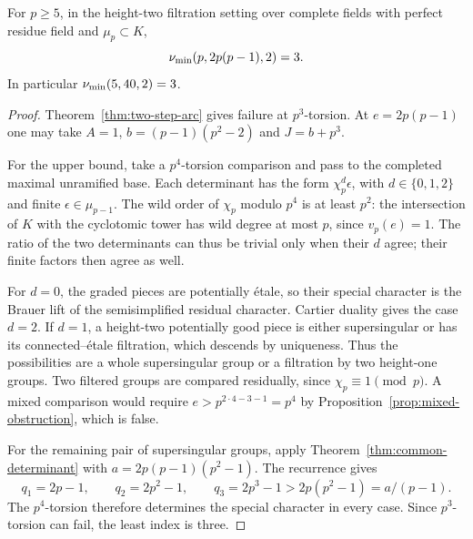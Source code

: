 \begin{theorem}\label{thm:second-wild-exact}
For $p\ge5$, in the height-two filtration setting over complete fields with perfect residue field and $\mu_p\subset K$,
\[
                         \nu_{\min}(p,2p(p-1),2)=3.
\]
In particular $\nu_{\min}(5,40,2)=3$.
\end{theorem}
\begin{proof}
Theorem~\ref{thm:two-step-arc} gives failure at $p^3$-torsion. At $e=2p(p-1)$ one may take $A=1$, $b=(p-1)(p^2-2)$ and $J=b+p^3$.

For the upper bound, take a $p^4$-torsion comparison and pass to the completed maximal unramified base. Each determinant has the form $\chi_p^d\epsilon$, with $d\in\{0,1,2\}$ and finite $\epsilon\in\mu_{p-1}$. The wild order of $\chi_p$ modulo $p^4$ is at least $p^2$: the intersection of $K$ with the cyclotomic tower has wild degree at most $p$, since $v_p(e)=1$. The ratio of the two determinants can thus be trivial only when their $d$ agree; their finite factors then agree as well.

For $d=0$, the graded pieces are potentially \'etale, so their special character is the Brauer lift of the semisimplified residual character. Cartier duality gives the case $d=2$. If $d=1$, a height-two potentially good piece is either supersingular or has its connected--\'etale filtration, which descends by uniqueness. Thus the possibilities are a whole supersingular group or a filtration by two height-one groups. Two filtered groups are compared residually, since $\chi_p\equiv1\pmod p$. A mixed comparison would require $e>p^{2\cdot4-3-1}=p^4$ by Proposition~\ref{prop:mixed-obstruction}, which is false.

For the remaining pair of supersingular groups, apply Theorem~\ref{thm:common-determinant} with $a=2p(p-1)(p^2-1)$. The recurrence gives
\[
 q_1=2p-1,\qquad q_2=2p^2-1,\qquad
 q_3=2p^3-1>2p(p^2-1)=a/(p-1).
\]
The $p^4$-torsion therefore determines the special character in every case. Since $p^3$-torsion can fail, the least index is three.
\end{proof}
